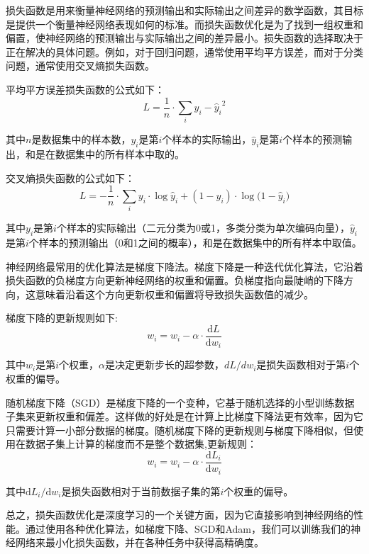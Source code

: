 损失函数是用来衡量神经网络的预测输出和实际输出之间差异的数学函数，其目标是提供一个衡量神经网络表现如何的标准。而损失函数优化是为了找到一组权重和偏置，使神经网络的预测输出与实际输出之间的差异最小。损失函数的选择取决于正在解决的具体问题。例如，对于回归问题，通常使用平均平方误差，而对于分类问题，通常使用交叉熵损失函数。

平均平方误差损失函数的公式如下：
\begin{equation}
\label{eq:2_18}
L = \frac{1}{n} \cdot \sum _i{y_i - \hat y_{i}}^2
\end{equation}

其中$n$是数据集中的样本数，$y_i$是第$i$个样本的实际输出，$\hat y_{i}$是第$i$个样本的预测输出，和是在数据集中的所有样本中取的。

交叉熵损失函数的公式如下：
\begin{equation}
\label{eq:2_19}
L = - \frac{1}{n} \cdot \sum _i{y_i \cdot \log{\hat y_i} + (1 - y_i) \cdot \log{(1 -\hat y_i})}
\end{equation}

其中$y_i$是第$i$个样本的实际输出（二元分类为0或1，多类分类为单次编码向量），$\hat y_i$是第$i$个样本的预测输出（0和1之间的概率），和是在数据集中的所有样本中取值。

神经网络最常用的优化算法是梯度下降法。梯度下降是一种迭代优化算法，它沿着损失函数的负梯度方向更新神经网络的权重和偏置。负梯度指向最陡峭的下降方向，这意味着沿着这个方向更新权重和偏置将导致损失函数值的减少。

梯度下降的更新规则如下:
\begin{equation}
\label{eq:2_20}
w_i = w_i - \alpha \cdot \frac{\mathrm{d}{L}}{\mathrm{d}{w_i}}
\end{equation}


其中$w_i$是第$i$个权重，$\alpha$是决定更新步长的超参数，$dL/dw_i$是损失函数相对于第$i$个权重的偏导。


随机梯度下降（SGD）是梯度下降的一个变种，它基于随机选择的小型训练数据子集来更新权重和偏差。这样做的好处是在计算上比梯度下降法更有效率，因为它只需要计算一小部分数据的梯度。随机梯度下降的更新规则与梯度下降相似，但使用在数据子集上计算的梯度而不是整个数据集,更新规则：
\begin{equation}
\label{eq:2_21}
w_i = w_i - \alpha \cdot \frac{\mathrm{d}{L_i}}{\mathrm{d}{w_i}}
\end{equation}

其中$\mathrm{d}{L_i} / \mathrm{d}{w_i}$是损失函数相对于当前数据子集的第$i$个权重的偏导。

总之，损失函数优化是深度学习的一个关键方面，因为它直接影响到神经网络的性能。通过使用各种优化算法，如梯度下降、SGD和Adam，我们可以训练我们的神经网络来最小化损失函数，并在各种任务中获得高精确度。


